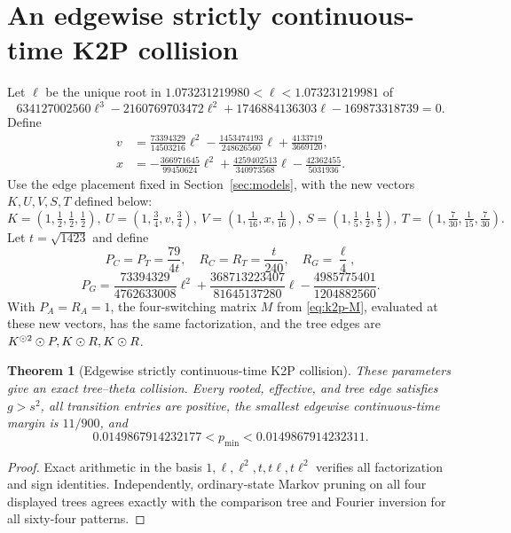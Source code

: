 \documentclass[11pt]{article}
\newtheorem{theorem}{Theorem}\newtheorem{proposition}[theorem]{Proposition}\newtheorem{lemma}[theorem]{Lemma}\newtheorem{corollary}[theorem]{Corollary}
\theoremstyle{remark}\newtheorem{remark}[theorem]{Remark}
\begin{document}
\section{An edgewise strictly continuous-time K2P collision}\label{sec:k2p-ct}
Let $\ell$ be the unique root in $1.073231219980<\ell<1.073231219981$ of
\begin{equation}\label{eq:ell}634127002560\ell^3-2160769703472\ell^2+1746884136303\ell-169873318739=0.\end{equation}
Define
\begin{align*}
v&=\frac{73394329}{14503216}\ell^2-\frac{1453474193}{248626560}\ell+\frac{4133719}{3669120},\\
x&=-\frac{366971645}{99450624}\ell^2+\frac{4259402513}{340973568}\ell-\frac{42362455}{5031936}.
\end{align*}
Use the edge placement fixed in Section~\ref{sec:models}, with the new vectors $K,U,V,S,T$ defined below:
\begin{equation}\label{eq:k2p-ct-vectors}
K=(1,\tfrac12,\tfrac12,\tfrac12),\ U=(1,\tfrac34,v,\tfrac34),\ V=(1,\tfrac1{16},x,\tfrac1{16}),\ S=(1,\tfrac15,\tfrac12,\tfrac15),\ T=(1,\tfrac7{30},\tfrac1{15},\tfrac7{30}).
\end{equation}
Let $t=\sqrt{1423}$ and define
\[
P_C=P_T=\frac{79}{4t},\quad R_C=R_T=\frac{t}{240},\quad R_G=\frac\ell4,
\]
\[
P_G=\frac{73394329}{4762633008}\ell^2+\frac{368713223407}{81645137280}\ell-\frac{4985775401}{1204882560}.
\]
With $P_A=R_A=1$, the four-switching matrix $M$ from \eqref{eq:k2p-M}, evaluated at these new vectors, has the same factorization, and the tree edges are $K^{\mathbin{\odot}2}\mathbin{\odot} P,K\mathbin{\odot} R,K\mathbin{\odot} R$.
\begin{theorem}[Edgewise strictly continuous-time K2P collision]\label{thm:k2p-ct}
These parameters give an exact tree--theta collision. Every rooted, effective, and tree edge satisfies $g>s^2$, all transition entries are positive, the smallest edgewise continuous-time margin is $11/900$, and
\[
0.0149867914232177<p_{\min}<0.0149867914232311.
\]
\end{theorem}
\begin{proof}
Exact arithmetic in the basis $1,\ell,\ell^2,t,t\ell,t\ell^2$ verifies all factorization and sign identities. Independently, ordinary-state Markov pruning on all four displayed trees agrees exactly with the comparison tree and Fourier inversion for all sixty-four patterns.
\end{proof}
\end{document}
